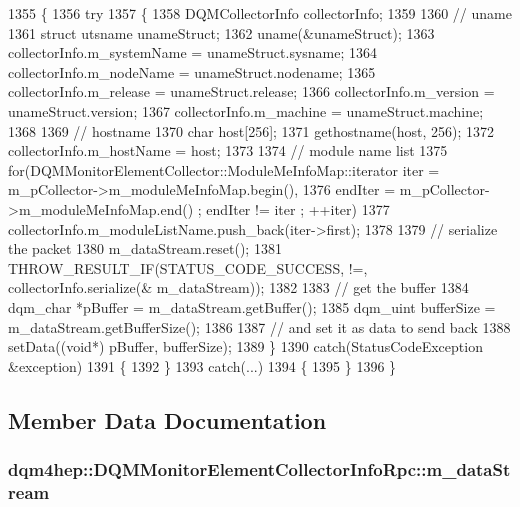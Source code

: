 \begin{DoxyCode}
1355 \{
1356   \textcolor{keywordflow}{try}
1357   \{
1358     DQMCollectorInfo collectorInfo;
1359 
1360     \textcolor{comment}{// uname}
1361     \textcolor{keyword}{struct }utsname unameStruct;
1362     uname(&unameStruct);
1363     collectorInfo.m\_systemName = unameStruct.sysname;
1364     collectorInfo.m\_nodeName = unameStruct.nodename;
1365     collectorInfo.m\_release = unameStruct.release;
1366     collectorInfo.m\_version = unameStruct.version;
1367     collectorInfo.m\_machine = unameStruct.machine;
1368 
1369     \textcolor{comment}{// hostname}
1370     \textcolor{keywordtype}{char} host[256];
1371     gethostname(host, 256);
1372     collectorInfo.m\_hostName = host;
1373 
1374     \textcolor{comment}{// module name list}
1375     \textcolor{keywordflow}{for}(DQMMonitorElementCollector::ModuleMeInfoMap::iterator iter = 
      m_pCollector->m_moduleMeInfoMap.begin(),
1376         endIter = m_pCollector->m_moduleMeInfoMap.end() ; endIter != iter ; ++iter)
1377       collectorInfo.m\_moduleListName.push\_back(iter->first);
1378 
1379     \textcolor{comment}{// serialize the packet}
1380     m_dataStream.reset();
1381     THROW_RESULT_IF(STATUS\_CODE\_SUCCESS, !=, collectorInfo.serialize(&
      m_dataStream));
1382 
1383     \textcolor{comment}{// get the buffer}
1384     dqm_char *pBuffer = m_dataStream.getBuffer();
1385     dqm_uint bufferSize = m_dataStream.getBufferSize();
1386 
1387     \textcolor{comment}{// and set it as data to send back}
1388     setData((\textcolor{keywordtype}{void}*) pBuffer, bufferSize);
1389   \}
1390   \textcolor{keywordflow}{catch}(StatusCodeException &exception)
1391   \{
1392   \}
1393   \textcolor{keywordflow}{catch}(...)
1394   \{
1395   \}
1396 \}
\end{DoxyCode}


\subsection{Member Data Documentation}
\subsubsection[{m\+\_\+data\+Stream}]{ dqm4hep\+::\+D\+Q\+M\+Monitor\+Element\+Collector\+Info\+Rpc\+::m\+\_\+data\+Stream\hspace{0.3cm}{\ttfamily [private]}}\label{classdqm4hep_1_1DQMMonitorElementCollectorInfoRpc_af93ca1652c73152491aa2c101ae399d5}


